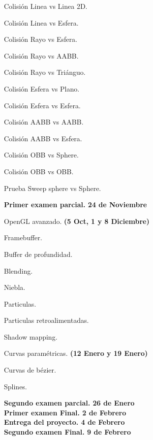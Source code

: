 \documentclass[a4paper,11pt]{article}
\theoremstyle{mytheor}
\begin{document}
\begin{legal}
\begin{legal}
		\item Colisión Linea vs Linea 2D.
		\item Colisión Linea vs Esfera.
		\item Colisión Rayo vs Esfera.
		\item Colisión Rayo vs AABB.
		\item Colisión Rayo vs Triánguo.
		\item Colisión Esfera vs Plano.
		\item Colisión Esfera vs Esfera.
		\item Colisión AABB vs AABB.
		\item Colisión AABB vs Esfera.
		\item Colisión OBB vs Sphere.
		\item Colisión OBB vs OBB.
		\item Prueba Sweep sphere vs Sphere.
	\end{legal}
	\textbf{Primer examen parcial. 24 de Noviembre}
	\item OpenGL avanzado. \textbf{(5 Oct, 1 y 8 Diciembre)}
	\begin{legal}
		\item Framebuffer.
		\item Buffer de profundidad.
		\item Blending.
		\item Niebla.
		\item Particulas.
		\item Particulas retroalimentadas.
		\item Shadow mapping.
	\end{legal}	
	\item Curvas paramétricas. \textbf{(12 Enero y 19 Enero)}
	\begin{legal}
		\item Curvas de bézier.
		\item Splines.
	\end{legal}
	\textbf{Segundo examen parcial. 26 de Enero}
	\\ \textbf{Primer examen Final. 2 de Febrero}
	\\ \textbf{Entrega del proyecto. 4 de Febrero }
	\\ \textbf{Segundo examen Final. 9 de Febrero}
	
\end{legal}
\end{document}
